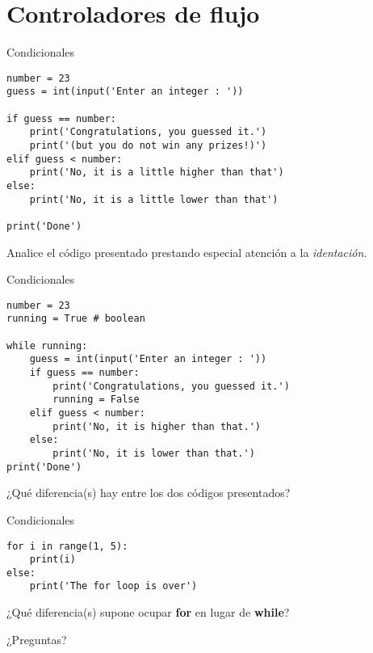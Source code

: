 \documentclass[10pt]{beamer}
\begin{document}
\section{Controladores de flujo}
\begin{frame}[fragile]{Condicionales}
   \begin{verbatim}
number = 23
guess = int(input('Enter an integer : '))

if guess == number:
	print('Congratulations, you guessed it.')
	print('(but you do not win any prizes!)')
elif guess < number:
	print('No, it is a little higher than that')
else:
	print('No, it is a little lower than that')

print('Done')
   \end{verbatim}
\begin{center}
	Analice el código presentado prestando especial atención a la \emph{identación}.
\end{center}
\end{frame}

\begin{frame}[fragile]{Condicionales}
 \begin{verbatim}
number = 23
running = True # boolean

while running:
	guess = int(input('Enter an integer : '))
	if guess == number:
		print('Congratulations, you guessed it.')
		running = False
	elif guess < number:
		print('No, it is higher than that.')
	else:
		print('No, it is lower than that.')
print('Done')
\end{verbatim}
\begin{center}
	¿Qué diferencia(s) hay entre los dos códigos presentados?
\end{center}  
\end{frame}

\begin{frame}[fragile]{Condicionales}
\begin{verbatim}
for i in range(1, 5):
	print(i)
else:
	print('The for loop is over')
\end{verbatim}

\begin{center}
	¿Qué diferencia(s) supone ocupar \textbf{for} en lugar de \textbf{while}?  
\end{center}
\end{frame}

\begin{frame}[standout]
	¿Preguntas?
\end{frame}
\end{document}
